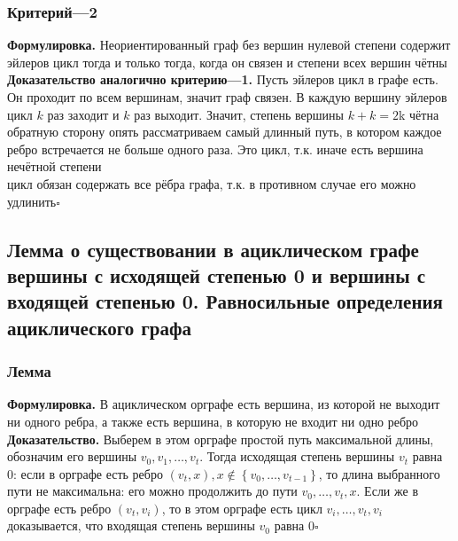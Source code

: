\documentclass[a4paper]{article}
\newcommand{\qed}{\hfill$\square$}
\begin{document}
\subsubsection*{Критерий—2}
\textbf{Формулировка.} Неориентированный граф без вершин нулевой степени содержит эйлеров цикл тогда и только тогда, когда он связен и степени всех вершин чётны\\[2mm]
\indent\textbf{Доказательство аналогично критерию—1.} Пусть эйлеров цикл в графе есть. Он проходит по всем вершинам, значит граф связен. В каждую вершину эйлеров цикл $k$ раз заходит и $k$ раз выходит. Значит, степень вершины $k + k = 2$k чётна\\[2mm]
 обратную сторону опять рассматриваем самый длинный путь, в котором каждое ребро встречается не больше одного раза. Это цикл, т.к. иначе есть вершина нечётной степени\\
 цикл обязан содержать все рёбра графа, т.к. в противном случае его можно удлинить\qed

\subsection{Лемма о существовании в ациклическом графе вершины с исходящей степенью 0 и вершины с входящей степенью 0. Равносильные определения ациклического графа}
\subsubsection*{Лемма}
\textbf{Формулировка.} В ациклическом орграфе есть вершина, из которой не выходит ни одного ребра, а также есть вершина, в которую не входит ни одно ребро\\[2mm]
\indent\textbf{Доказательство.} Выберем в этом орграфе простой путь максимальной длины, обозначим его вершины $v_0, v_1, \ldots, v_t$. Тогда исходящая степень вершины $v_t$ равна 0: если в орграфе есть ребро $\left(v_t, x\right), x \notin\left\{v_0, \ldots, v_{t-1}\right\}$, то длина выбранного пути не максимальна: его можно продолжить до пути $v_0, \ldots, v_t, x$. Если же в орграфе есть ребро $\left(v_t, v_i\right)$, то в этом орграфе есть цикл $v_i, \ldots, v_t, v_i$\\[2mm]
 доказывается, что входящая степень вершины $v_0$ равна 0\qed
\label{2.21}
\end{document}
